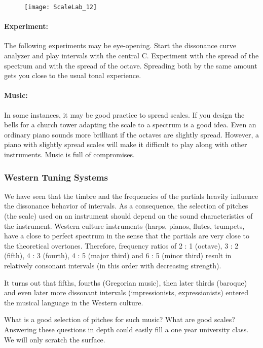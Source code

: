 \begin{figure}[h]
\centering
\texttt{[image: ScaleLab\_12]}
\end{figure}

\paragraph{Experiment:}
The following experiments may be eye-opening. Start the dissonance curve analyzer and play intervals with the central C. Experiment with the spread of the spectrum and with the spread of the octave. Spreading both by the same amount gets you close to the usual tonal experience.

\paragraph{Music:}
In some instances, it may be good practice to spread scales. If you design the bells for a church tower adapting the scale to a spectrum is a good idea. Even an ordinary piano sounds more brilliant if the octaves are slightly spread. However, a piano with slightly spread scales will make it difficult to play along with other instruments. Music is full of compromises.

\subsubsection{Western Tuning Systems}
We have seen that the timbre and the frequencies of the partials heavily influence the dissonance behavior of intervals. As a consequence, the selection of pitches (the scale) used on an instrument should depend on the sound characteristics of the instrument. Western culture instruments (harps, pianos, flutes, trumpets, have a close to perfect spectrum in the sense that the partials are very close to the theoretical overtones. Therefore, frequency ratios of 2 : 1 (octave), 3 : 2 (fifth), 4 : 3 (fourth), 4 : 5 (major third) and 6 : 5 (minor third) result in relatively consonant intervals (in this order with decreasing strength).

It turns out that fifths, fourths (Gregorian music), then later thirds (baroque) and even later more dissonant intervals (impressionists, expressionists) entered the musical language in the Western culture.

What is a good selection of pitches for such music? What are good scales? Answering these questions in depth could easily fill a one year university class. We will only scratch the surface.



